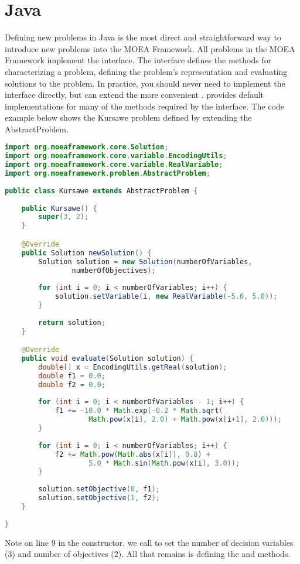 \section{Java}
Defining new problems in Java is the most direct and straightforward way to introduce new problems into the MOEA Framework.  All problems in the MOEA Framework implement the  interface.  The  interface defines the methods for characterizing a problem, defining the problem's representation and evaluating solutions to the problem.  In practice, you should never need to implement the  interface directly, but can extend the more convenient .   provides default implementations for many of the methods required by the  interface.  The code example below shows the Kursawe problem defined by extending the AbstractProblem.

\begin{lstlisting}[language=Java]
import org.moeaframework.core.Solution;
import org.moeaframework.core.variable.EncodingUtils;
import org.moeaframework.core.variable.RealVariable;
import org.moeaframework.problem.AbstractProblem;
 
public class Kursawe extends AbstractProblem {
 
	public Kursawe() {
		super(3, 2);
	}

	@Override
	public Solution newSolution() {
		Solution solution = new Solution(numberOfVariables, 
				numberOfObjectives);
 
		for (int i = 0; i < numberOfVariables; i++) {
			solution.setVariable(i, new RealVariable(-5.0, 5.0));
		}
 
		return solution;
	}

	@Override
	public void evaluate(Solution solution) {
		double[] x = EncodingUtils.getReal(solution);
		double f1 = 0.0;
		double f2 = 0.0;
   	 
		for (int i = 0; i < numberOfVariables - 1; i++) {
			f1 += -10.0 * Math.exp(-0.2 * Math.sqrt(
					Math.pow(x[i], 2.0) + Math.pow(x[i+1], 2.0)));
		}
 
		for (int i = 0; i < numberOfVariables; i++) {
			f2 += Math.pow(Math.abs(x[i]), 0.8) +  
					5.0 * Math.sin(Math.pow(x[i], 3.0));
		}
 
		solution.setObjective(0, f1);
		solution.setObjective(1, f2);
	}
 
}
\end{lstlisting}

Note on line 9 in the constructor, we call  to set the number of decision variables (3) and number of objectives (2).  All that remains is defining the  and  methods.

